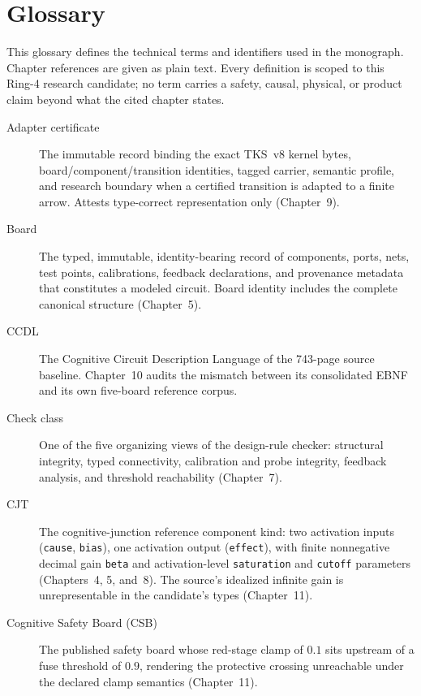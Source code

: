 \chapter{Glossary}\label{appC:glossary}

This glossary defines the technical terms and identifiers used in the monograph.
Chapter references are given as plain text. Every definition is scoped to this
Ring-4 research candidate; no term carries a safety, causal, physical, or product
claim beyond what the cited chapter states.

\begin{description}

\item[Adapter certificate] The immutable record binding the exact TKS~v8 kernel
bytes, board/component/transition identities, tagged carrier, semantic profile,
and research boundary when a certified transition is adapted to a finite arrow.
Attests type-correct representation only (Chapter~9).

\item[Board] The typed, immutable, identity-bearing record of components, ports,
nets, test points, calibrations, feedback declarations, and provenance metadata
that constitutes a modeled circuit. Board identity includes the complete
canonical structure (Chapter~5).

\item[CCDL] The Cognitive Circuit Description Language of the 743-page source
baseline. Chapter~10 audits the mismatch between its consolidated EBNF and its
own five-board reference corpus.

\item[Check class] One of the five organizing views of the design-rule checker:
structural integrity, typed connectivity, calibration and probe integrity,
feedback analysis, and threshold reachability (Chapter~7).

\item[CJT] The cognitive-junction reference component kind: two activation
inputs (\texttt{cause}, \texttt{bias}), one activation output (\texttt{effect}),
with finite nonnegative decimal gain \texttt{beta} and activation-level
\texttt{saturation} and \texttt{cutoff} parameters (Chapters~4, 5, and~8). The
source's idealized infinite gain is unrepresentable in the candidate's types
(Chapter~11).

\item[Cognitive Safety Board (CSB)] The published safety board whose red-stage
clamp of $0.1$ sits upstream of a fuse threshold of $0.9$, rendering the
protective crossing unreachable under the declared clamp semantics
(Chapter~11).


\end{description}
